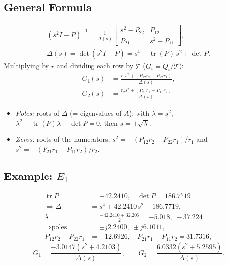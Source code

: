 \documentclass[10pt,twocolumn,letterpaper]{article}
\begin{document}
\subsection{General Formula}
\begin{gather*}
(s^2I-P)^{-1}=\frac{1}{\Delta(s)}\begin{bmatrix}s^2-P_{22}&P_{12}\\P_{21}&s^2-P_{11}\end{bmatrix},\\
\Delta(s)=\det(s^2I-P)=s^4-\operatorname{tr}(P)\,s^2+\det P .
\end{gather*}
Multiplying by $r$ and dividing each row by $\tilde{\mathcal T}$ ($G_i=\tilde Q_i/\tilde{\mathcal T}$):
\begin{equation}
\boxed{\begin{aligned}
G_1(s)&=\frac{r_1s^2+(P_{12}r_2-P_{22}r_1)}{\Delta(s)},\\[2pt]
G_2(s)&=\frac{r_2s^2+(P_{21}r_1-P_{11}r_2)}{\Delta(s)}
\end{aligned}}\label{eq:G}
\end{equation}
\begin{itemize}
\item \textit{Poles:} roots of $\Delta$ (= eigenvalues of $A$); with $\lambda=s^2$, $\lambda^2-\operatorname{tr}(P)\lambda+\det P=0$, then $s=\pm\sqrt\lambda$.
\item \textit{Zeros:} roots of the numerators, $s^2=-(P_{12}r_2-P_{22}r_1)/r_1$ and $s^2=-(P_{21}r_1-P_{11}r_2)/r_2$.
\end{itemize}

\subsection{Example: $E_1$}
\begin{align*}
\operatorname{tr}P&=-42.2410,\quad \det P=186.7719\\
\Rightarrow\Delta&=s^4+42.2410\,s^2+186.7719,\\
\lambda&=\tfrac{-42.2410\pm32.206}{2}=-5.018,\;-37.224\\
\Rightarrow\text{poles}&=\pm j2.2400,\;\pm j6.1011,\\
P_{12}r_2-P_{22}r_1&=-12.6926,\quad P_{21}r_1-P_{11}r_2=31.7316,
\end{align*}
\begin{equation*}
G_1=\frac{-3.0147(s^2+4.2103)}{\Delta(s)},\qquad G_2=\frac{6.0332(s^2+5.2595)}{\Delta(s)} .
\end{equation*}
\end{document}
